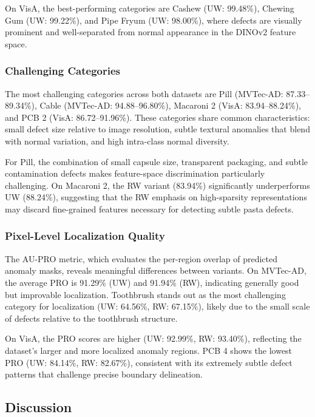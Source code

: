 On VisA, the best-performing categories are Cashew (UW: 99.48\%), Chewing Gum (UW: 99.22\%), and Pipe Fryum (UW: 98.00\%), where defects are visually prominent and well-separated from normal appearance in the DINOv2 feature space.

\subsubsection{Challenging Categories}

The most challenging categories across both datasets are Pill (MVTec-AD: 87.33--89.34\%), Cable (MVTec-AD: 94.88--96.80\%), Macaroni 2 (VisA: 83.94--88.24\%), and PCB 2 (VisA: 86.72--91.96\%).
These categories share common characteristics: small defect size relative to image resolution, subtle textural anomalies that blend with normal variation, and high intra-class normal diversity.

For Pill, the combination of small capsule size, transparent packaging, and subtle contamination defects makes feature-space discrimination particularly challenging.
On Macaroni 2, the RW variant (83.94\%) significantly underperforms UW (88.24\%), suggesting that the RW emphasis on high-sparsity representations may discard fine-grained features necessary for detecting subtle pasta defects.

\subsubsection{Pixel-Level Localization Quality}

The AU-PRO metric, which evaluates the per-region overlap of predicted anomaly masks, reveals meaningful differences between variants.
On MVTec-AD, the average PRO is 91.29\% (UW) and 91.94\% (RW), indicating generally good but improvable localization.
Toothbrush stands out as the most challenging category for localization (UW: 64.56\%, RW: 67.15\%), likely due to the small scale of defects relative to the toothbrush structure.

On VisA, the PRO scores are higher (UW: 92.99\%, RW: 93.40\%), reflecting the dataset's larger and more localized anomaly regions.
PCB 4 shows the lowest PRO (UW: 84.14\%, RW: 82.67\%), consistent with its extremely subtle defect patterns that challenge precise boundary delineation.

\subsection{Discussion}

